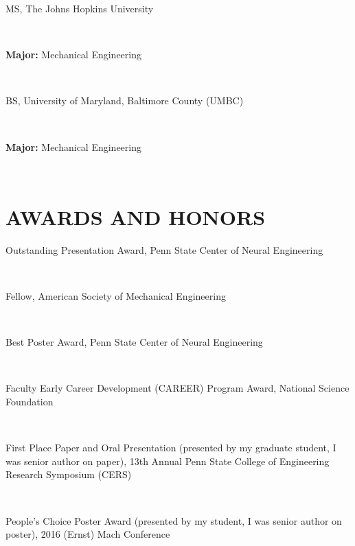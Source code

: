\documentclass[a4paper,10pt]{article}
\begin{document}
            \noindent \parbox[t]{0.8\linewidth}{\raggedright MS, The Johns Hopkins University} \hfill \parbox[t]{0.2\linewidth}{} \\
            \noindent \parbox[t]{0.8\linewidth}{\raggedright \textbf{Major:} Mechanical Engineering} \\
            
            \noindent \parbox[t]{0.8\linewidth}{\raggedright BS, University of Maryland,  Baltimore County (UMBC)} \hfill \parbox[t]{0.2\linewidth}{} \\
            \noindent \parbox[t]{0.8\linewidth}{\raggedright \textbf{Major:} Mechanical Engineering} \\
            

    \section*{AWARDS AND HONORS}
    
        \noindent \parbox[t]{0.8\linewidth}{\raggedright Outstanding Presentation Award, Penn State Center of Neural Engineering} \hfill \parbox[t]{0.2\linewidth}{} \\
        
        \noindent \parbox[t]{0.8\linewidth}{\raggedright Fellow, American Society of Mechanical Engineering} \hfill \parbox[t]{0.2\linewidth}{} \\
        
        \noindent \parbox[t]{0.8\linewidth}{\raggedright Best Poster Award, Penn State Center of Neural Engineering} \hfill \parbox[t]{0.2\linewidth}{} \\
        
        \noindent \parbox[t]{0.8\linewidth}{\raggedright Faculty Early Career Development (CAREER) Program Award, National Science Foundation} \hfill \parbox[t]{0.2\linewidth}{} \\
        
        \noindent \parbox[t]{0.8\linewidth}{\raggedright First Place Paper and Oral Presentation (presented by my graduate student, I was senior author on paper), 13th Annual Penn State College of Engineering Research Symposium (CERS)} \hfill \parbox[t]{0.2\linewidth}{} \\
        
        \noindent \parbox[t]{0.8\linewidth}{\raggedright People's Choice Poster Award (presented by my student, I was senior author on poster), 2016 (Ernst) Mach Conference} \hfill \parbox[t]{0.2\linewidth}{} \\
        
\end{document}
